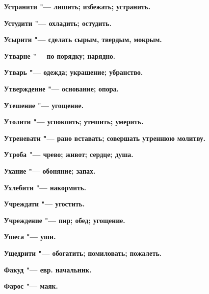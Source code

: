 \bfseries Устранити \normalfont{} "--- лишить; избежать; устранить. 




\bfseries Устудити \normalfont{} "--- охладить; остудить. 




\bfseries Усырити \normalfont{} "--- сделать сырым, твердым, мокрым. 




\bfseries Утварне \normalfont{} "--- по порядку; нарядно. 




\bfseries Утварь \normalfont{} "--- одежда; украшение; убранство. 




\bfseries Утверждение \normalfont{} "--- основание; опора. 




\bfseries Утешение \normalfont{} "--- угощение. 




\bfseries Утолити \normalfont{} "--- успокоить; утешить; умерить. 




\bfseries Утреневати \normalfont{} "--- рано вставать; совершать утреннюю молитву. 




\bfseries Утроба \normalfont{} "--- чрево; живот; сердце; душа. 




\bfseries Ухание \normalfont{} "--- обоняние; запах. 




\bfseries Ухлебити \normalfont{} "--- накормить. 




\bfseries Учреждати \normalfont{} "--- угостить. 




\bfseries Учреждение \normalfont{} "--- пир; обед; угощение. 




\bfseries Ушеса \normalfont{} "--- уши. 




\bfseries Ущедрити \normalfont{} "--- обогатить; помиловать; пожалеть. 




 





\bfseries Факуд \normalfont{} "--- евр. начальник. 




\bfseries Фарос \normalfont{} "--- маяк. 




